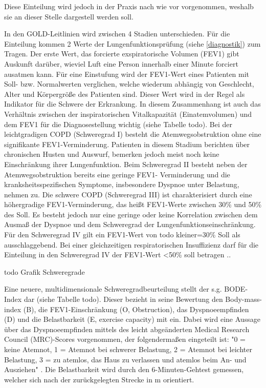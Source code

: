Diese Einteilung wird jedoch in der Praxis nach wie vor vorgenommen, weshalb sie an dieser Stelle dargestell werden soll.

In den GOLD-Leitlinien wird zwischen 4 Stadien unterschieden. Für die Einteilung kommen 2 Werte der Lungenfunktionsprüfung (siehe \ref{diagnostik}) zum Tragen. Der erste Wert, das forcierte exspiratorische Volumen (FEV1) gibt Auskunft darüber, wieviel Luft eine Person innerhalb einer Minute forciert ausatmen kann. Für eine Einstufung wird der FEV1-Wert eines Patienten mit Soll- bzw. Normalwerten verglichen, welche wiederum abhängig von Geschlecht, Alter und Körpergröße des Patienten sind. Dieser Wert wird in der Regel als Indikator für die Schwere der Erkrankung. In diesem Zusammenhang ist auch das Verhältnis zwischen der inspiratorischen Vitalkapazität (Einatemvolumen) und dem FEV1 für die Diagnosestellung wichtig (siehe Tabelle todo). Bei der leichtgradigen COPD (Schweregrad I) besteht die Atemwegsobstruktion ohne eine signifikante FEV1-Verminderung. Patienten in diesem Stadium berichten über chronischen Husten und Auswurf, bemerken jedoch meist noch keine Einschränkung ihrer Lungenfunktion. Beim Schweregrad II besteht neben der Atemwegsobstruktion bereits eine geringe FEV1- Verminderung und die kranksheitsspezifischen Symptome, insbesondere Dyspnoe unter Belastung, nehmen zu. Die schwere COPD (Schweregrad III) ist charakterisiert durch eine höhergradige FEV1-Verminderung, das heißt FEV1-Werte zwischen 30\% und 50\% des Soll. Es besteht jedoch nur eine geringe oder keine Korrelation zwischen dem Ausmaß der Dyspnoe und dem Schweregrad der Lungenfunktionseinschränkung. Für den Schweregrad IV gilt ein FEV1-Wert von todo kleiner=30\% Soll als ausschlaggebend. Bei einer gleichzeitigen respiratorischen Insuffizienz darf für die Einteilung in den Schweregrad IV der FEV1-Wert <50\% soll betragen \autocite[vgl.][e8]{vogelmeier2007}..

todo Grafik Schweregrade

Eine neuere, multidimensionale Schweregradbeurteilung stellt der s.g. BODE-Index dar (siehe Tabelle todo). Dieser bezieht in seine Bewertung den Body-mass-index (B), die FEV1-Einschränkung (O, Obstruction), das Dyspnoeempfinden (D) und die Belastbarkeit (E, exercise capacity) mit ein. Dabei wird eine Aussage über das Dyspnoeempfinden mittels des leicht abgeänderten Medical Research Council (MRC)-Scores vorgenommen, der folgendermaßen eingeteilt ist: "0 = keine Atemnot, 1 = Atemnot bei schwerer Belastung, 2 = Atemnot bei leichter Belastung, 3 = zu atemlos, das Haus zu verlassen und atemlos beim An- und Ausziehen" \autocite[186f.]{welte2007}. Die Belastbarkeit wird durch den 6-Minuten-Gehtest gemessen, welcher sich nach der zurückgelegten Strecke in m orientiert. 

